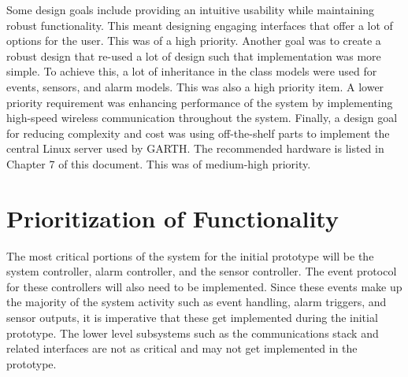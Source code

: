 \documentclass{report}
\begin{document}
Some design goals include providing an intuitive usability while maintaining
robust functionality. This meant designing engaging interfaces that offer a lot
of options for the user. This was of a high priority. Another goal was to
create a robust design that re-used a lot of design such that implementation
was more simple. To achieve this, a lot of inheritance in the class models were
used for events, sensors, and alarm models. This was also a high priority item.
A lower priority requirement was enhancing performance of the system by
implementing high-speed wireless communication throughout the system. Finally,
a design goal for reducing complexity and cost was using off-the-shelf parts to
implement the central Linux server used by GARTH. The recommended hardware is
listed in Chapter 7 of this document. This was of medium-high priority.

\section{Prioritization of Functionality}

The most critical portions of the system for the initial prototype will be the
system controller, alarm controller, and the sensor controller. The event
protocol for these controllers will also need to be implemented. Since these
events make up the majority of the system activity such as event handling,
alarm triggers, and sensor outputs, it is imperative that these get implemented
during the initial prototype. The lower level subsystems such as the
communications stack and related interfaces are not as critical and may not get
implemented in the prototype.
\end{document}
